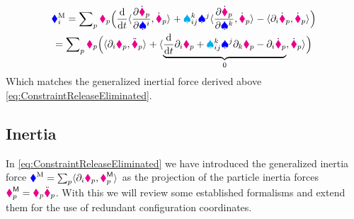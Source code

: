 \begin{multline}\label{eq:ResHamiltonPrinciple2}
 \genForceInertiaCoeff{\LidxI} = \sumParticles \particleMass{\PidxI} \Big(
 \diff{t} \sProd{\pdiff[\particlePosd{\PidxI}]{\sysVelCoeff{\LidxI}}}{\particlePosd{\PidxI}}
 + \BoltzSym{\LidxIII}{\LidxI}{\LidxII} \sysVelCoeff{\LidxII} \sProd{\pdiff[\particlePosd{\PidxI}]{\sysVelCoeff{\LidxIII}}}{\particlePosd{\PidxI}}
 - \sProd{\dirDiff{\LidxI} \particlePosd{\PidxI}}{\particlePosd{\PidxI}} \Big)
\\
 = \sumParticles \particleMass{\PidxI} \Big(
 \sProd{\dirDiff{\LidxI} \particlePos{\PidxI}}{\particlePosdd{\PidxI}}
 + \sProd{\underbrace{\diff{t} \dirDiff{\LidxI} \particlePos{\PidxI} + \BoltzSym{\LidxIII}{\LidxI}{\LidxII} \sysVelCoeff{\LidxII} \dirDiff{\LidxIII} \particlePos{\PidxI} - \dirDiff{\LidxI} \particlePosd{\PidxI}}_{0}}{\particlePosd{\PidxI}} \Big)
\end{multline}
Which matches the generalized inertial force derived above \eqref{eq:ConstraintReleaseEliminated}.



\subsection{Inertia}
In \eqref{eq:ConstraintReleaseEliminated} we have introduced the generalized inertia force $\genForceInertia = \sumParticles \sProd{\dirDiff{\LidxI} \particlePos{\PidxI}}{\particleForceInertia{\PidxI}}$ as the projection of the particle inertia forces $\particleForceInertia{\PidxI} = \particleMass{\PidxI} \particlePosdd{\PidxI}$.
With this we will review some established formalisms and extend them for the use of redundant configuration coordinates.

